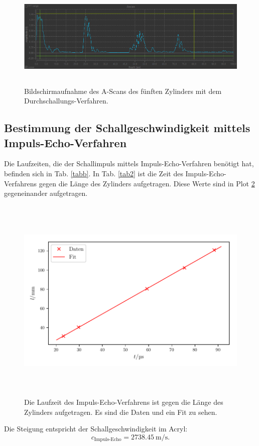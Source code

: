 \begin{figure}
    \centering
    \includegraphics[width=15cm, height=5cm]{build/Messung3.5.png}
    \caption{Bildschirmaufnahme des A-Scans des fünften Zylinders mit dem Durchschallungs-Verfahren.}
    \label{fig:m3.5}
\end{figure}

\subsection{Bestimmung der Schallgeschwindigkeit mittels Impuls-Echo-Verfahren}
Die Laufzeiten, die der Schallimpuls mittels Impuls-Echo-Verfahren benötigt hat,
befinden sich in Tab. \ref{tabb}. In Tab. \ref{tab2} ist die Zeit des Impuls-Echo-Verfahrens
gegen die Länge des Zylinders aufgetragen. Diese Werte sind in Plot \ref{fig:plot2}
gegeneinander aufgetragen.


\begin{figure}
    \centering
    \includegraphics[width=15cm, height=10cm]{build/plot2.pdf}
    \caption{Die Laufzeit des Impuls-Echo-Verfahrens ist gegen die Länge des Zylinders
    aufgetragen. Es sind die Daten und ein Fit zu sehen.}
    \label{fig:plot2}
\end{figure}
\noindent Die Steigung entspricht der Schallgeschwindigkeit im Acryl:
\begin{equation*}
    c_{\text{Impuls-Echo}} = \SI{2738.45}{\meter\per\second}.
\end{equation*}


